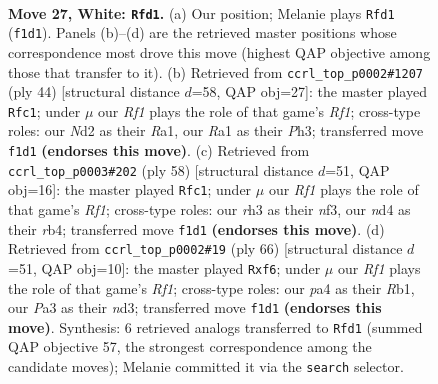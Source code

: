 \documentclass[11pt]{article}
\begin{document}
\clearpage

\begin{figure}[p]\centering
\begin{subfigure}{0.46\textwidth}\centering
\resizebox{\linewidth}{!}{%
\newchessgame
\chessboard[
  setfen={r5k1/8/8/3p2p1/p2n4/P4P1r/3N3P/R4RK1 w - - 0 27},
  showmover=false,
  pgfstyle=straightmove, color=movearrow, markmove={f1-d1}
]}
\caption{}
\end{subfigure}\hfill
\begin{subfigure}{0.46\textwidth}\centering
\resizebox{\linewidth}{!}{%
\newchessgame
\chessboard[
  setfen={4r1k1/p6p/4p3/2p2p2/8/4P2P/Pr3PP1/R4RK1 w - - 0 23},
  showmover=false,
  pgfstyle=straightmove, color=movearrow, markmove={f1-c1}
]}
\caption{}
\end{subfigure}
\\[4pt]
\begin{subfigure}{0.46\textwidth}\centering
\resizebox{\linewidth}{!}{%
\newchessgame
\chessboard[
  setfen={4r2k/2p2pp1/8/3P4/1r3P2/3B1n2/5P1P/R4R1K w - - 1 30},
  showmover=false,
  pgfstyle=straightmove, color=movearrow, markmove={f1-c1}
]}
\caption{}
\end{subfigure}\hfill
\begin{subfigure}{0.46\textwidth}\centering
\resizebox{\linewidth}{!}{%
\newchessgame
\chessboard[
  setfen={r7/1p1r3k/3N1p1p/6p1/1P2P3/3n2P1/7P/1R3RK1 w - - 2 34},
  showmover=false,
  pgfstyle=straightmove, color=movearrow, markmove={f1-f6}
]}
\caption{}
\end{subfigure}
\caption{\textbf{Move 27, White: \texttt{Rfd1}.} (a) Our position; Melanie plays \texttt{Rfd1} (\texttt{f1d1}). Panels (b)--(d) are the retrieved master positions whose correspondence most drove this move (highest QAP objective among those that transfer to it). (b) Retrieved from \texttt{ccrl\_top\_p0002\#1207} (ply 44) [structural distance $d$=58, QAP obj=27]: the master played \texttt{Rfc1}; under $\mu$ our \emph{Rf1} plays the role of that game's \emph{Rf1}; cross-type roles: our \emph{N}d2 as their \emph{R}a1, our \emph{R}a1 as their \emph{P}h3; transferred move \texttt{f1d1} \textbf{(endorses this move)}. (c) Retrieved from \texttt{ccrl\_top\_p0003\#202} (ply 58) [structural distance $d$=51, QAP obj=16]: the master played \texttt{Rfc1}; under $\mu$ our \emph{Rf1} plays the role of that game's \emph{Rf1}; cross-type roles: our \emph{r}h3 as their \emph{n}f3, our \emph{n}d4 as their \emph{r}b4; transferred move \texttt{f1d1} \textbf{(endorses this move)}. (d) Retrieved from \texttt{ccrl\_top\_p0002\#19} (ply 66) [structural distance $d$=51, QAP obj=10]: the master played \texttt{Rxf6}; under $\mu$ our \emph{Rf1} plays the role of that game's \emph{Rf1}; cross-type roles: our \emph{p}a4 as their \emph{R}b1, our \emph{P}a3 as their \emph{n}d3; transferred move \texttt{f1d1} \textbf{(endorses this move)}. Synthesis: 6 retrieved analogs transferred to \texttt{Rfd1} (summed QAP objective 57, the strongest correspondence among the candidate moves); Melanie committed it via the \texttt{search} selector.}
\label{fig:thought-m52}
\end{figure}
\end{document}
